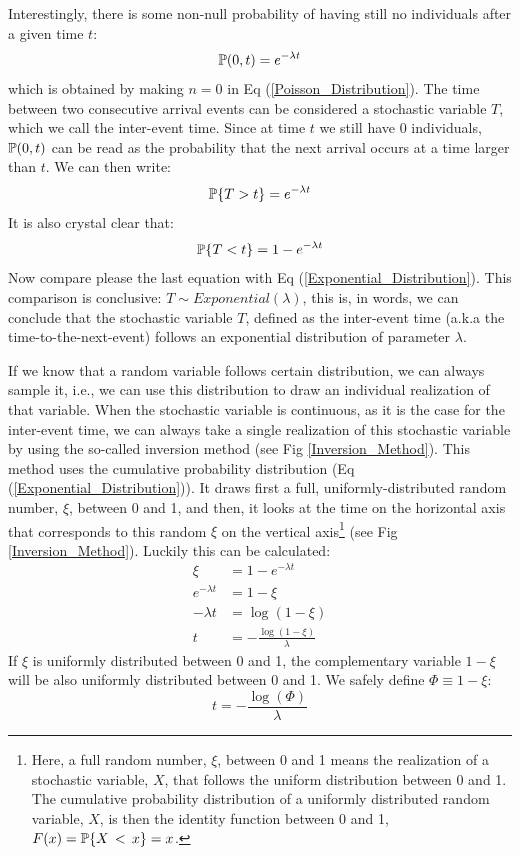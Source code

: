 Interestingly, there is some non-null probability of having still no individuals after a given time $t$:
\begin{equation}
{\mathbb P}(0, t) =  e^{-\lambda t}
\label{Eq_Exp_1}
\end{equation}
which is obtained by making $n=0$ in Eq (\ref{Poisson_Distribution}). The time between two consecutive arrival events can be considered a stochastic variable $T$, which we call the inter-event time.  Since at time $t$ we still have 0 individuals, ${\mathbb P}(0, t)$ can be read as the probability that the next arrival occurs at a time larger than $t$. We can then write:
\begin{equation}
{\mathbb P}\{T>t\} =  e^{-\lambda t}
\end{equation}
It is also crystal clear that:
\begin{equation}
{\mathbb P}\{T<t\} =  1 - e^{-\lambda t}
\end{equation}
Now compare please the last equation with Eq (\ref{Exponential_Distribution}). This comparison is conclusive: $T \sim Exponential(\lambda)$, this is, in words, we can conclude that the stochastic variable $T$, defined as the inter-event time (a.k.a the time-to-the-next-event) follows an exponential distribution of parameter $\lambda$. 
\smallskip

If we know that a random variable follows certain distribution, we can always sample it, i.e., we can use this distribution to draw an individual realization of that variable. When the stochastic variable is continuous, as it is the case for the inter-event time, we can always take a single realization of this stochastic variable by using the so-called inversion method (see Fig \ref{Inversion_Method}). This method uses the cumulative probability distribution (Eq (\ref{Exponential_Distribution})). It draws first a full, uniformly-distributed random number, $\xi$, between 0 and 1, and then, it looks at the time on the horizontal axis that corresponds to this random $\xi$ on the vertical axis\footnote{Here, a full random number, $\xi$, between 0 and 1 means the realization of a stochastic variable, $X$, that follows the uniform distribution between 0 and 1. The cumulative probability distribution of a uniformly distributed random variable, $X$, is then the identity function between 0 and 1, $F(x) = {\mathbb P}\{X\,<\,x\}= x$.}  (see Fig \ref{Inversion_Method}). Luckily this can be calculated:
\begin{align*}
 \xi            &= 1 - e^{-\lambda t}            \\
 e^{-\lambda t} &= 1 - \xi                       \\
 -\lambda t     &= \log(1 - \xi)                 \\
          t     &= -\frac{\log(1 - \xi)}{\lambda}
\end{align*}
If $\xi$ is uniformly distributed between 0 and 1, the complementary variable $1-\xi$ will be also uniformly distributed between 0 and 1. We safely define $\Phi \equiv 1-\xi$:
\begin{equation}
 t     = -\frac{\log(\Phi)}{\lambda}
 \label{Random_Time}
\end{equation}

